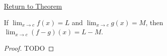 \newpage
{}
\label{prf:difference-rule-function-limits}

\begin{remark*}[Return]
\hyperref[thm:difference-rule-function-limits]{Return to Theorem}
\end{remark*}

\begin{theorem*}
If $\lim_{x\to c}f(x)=L$ and $\lim_{x\to c}g(x)=M$, then $\lim_{x\to c}(f-g)(x)=L-M$.
\end{theorem*}

\begin{proof}
TODO
\end{proof}
